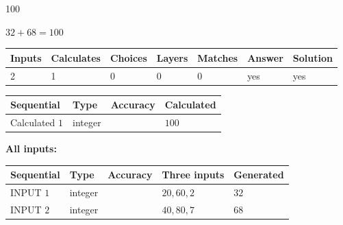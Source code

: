 \documentclass[12pt]{article}
\begin{document}
 

100
 
 
\noindent{}
 
 

 
 
 
\noindent{}
 
 

$ %
32 +  %
68=   %
100$
 
 
\noindent{}
 
 

 
   
   
   
   
\noindent\begin{tabular}{|l|l|l|l|l|l|l|}
 \hline
Inputs & Calculates & Choices & Layers & Matches & Answer & Solution \\ \hline
 2  & 
 1  & 
 0
  & 
 0  & 
 0  & 
  yes & 
  yes 
  \\ \hline
 \end{tabular}
   
   
   
   
\noindent{}
   
   
  
  
\noindent\begin{tabular}{|l|l|l|l|}
\hline
 Sequential & Type & Accuracy & Calculated \\ 
\hline
 
 
  Calculated $  1 $ & integer &  & 
  $ 100 $ 
 \\  \hline  
 \end{tabular}
   
   
   
   
\noindent\vspace{0.1in}\hspace{-0.08in} {\textbf{\Large{All inputs: }}}
   
   
  
  
\noindent\begin{tabular}{|l|l|l|l|l|}
\hline
 Sequential & Type & Accuracy & Three inputs & Generated \\ 
\hline
 
 
  INPUT $  1 $ & integer &  & $
 20
 , 
 60
 , 
 2
 $ & $ 32 $ 
 \\  \hline  
 
 
  INPUT $  2 $ & integer &  & $
 40
 , 
 80
 , 
 7
 $ & $ 68 $ 
 \\  \hline  
 \end{tabular}
   
\end{document}
